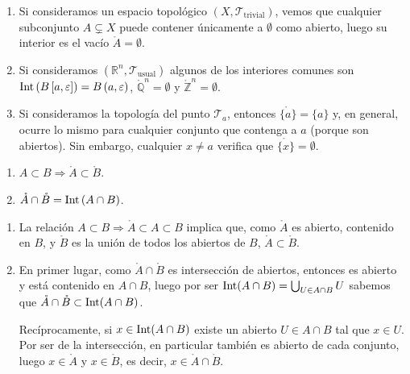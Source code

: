 \begin{ej}
\begin{enumerate}
    \item Si consideramos un espacio topológico $\left( X, \mathcal{T}_{\text{trivial}} \right)$, vemos que cualquier subconjunto $A \subsetneq X$ puede contener únicamente a $\emptyset$ como abierto, luego su interior es el vacío $\mathring{A} = \emptyset$.

    \item Si consideramos $(\mathbb{R}^n, \mathcal{T}_{\text{usual}})$ algunos de los interiores comunes son $\operatorname{Int}\left( B\left[ a, \varepsilon \right] \right)  = B\left( a, \varepsilon \right)$, $\mathring{\mathbb{Q}}^n = \emptyset$ y $\mathring{\mathbb{Z}}^n = \emptyset$.
    
    \item Si consideramos la topología del punto $\mathcal{T}_a$, entonces $\mathring{\{a\}} = \{a\}$ y, en general, ocurre lo mismo para cualquier conjunto que contenga a $a$ (porque son abiertos). Sin embargo, cualquier $x \neq a$ verifica que $\mathring{\{x\}} = \emptyset$.
\end{enumerate}
\end{ej}

\begin{coro}
\begin{enumerate}
    \item $A \subset B \Rightarrow \mathring{A} \subset \mathring{B}$.
    \item $\mathring{A} \cap \mathring{B} = \operatorname{Int} \left( A \cap B \right)$.
\end{enumerate}
\end{coro}
\begin{demo}
\begin{enumerate}
    \item La relación $A \subset B \Rightarrow \mathring{A} \subset A \subset B$ implica que, como $\mathring{A}$ es abierto, contenido en $B$, y $\mathring{B}$ es la unión de todos los abiertos de $B$, $\mathring{A} \subset \mathring{B}$.
    \item En primer lugar, como $\mathring{A}\cap \mathring{B}$ es intersección de abiertos, entonces es abierto y está contenido en $A\cap B$, luego por ser $\operatorname{Int}(A\cap B) = \bigcup_{U\in A\cap B}U$ sabemos que $\mathring{A}\cap \mathring{B} \subset \operatorname{Int}(A\cap B)$.
    
	Recíprocamente, si $x\in \operatorname{Int}(A\cap B)$ existe un abierto $U \in A\cap B$ tal que $x\in U$. Por ser de la intersección, en particular también es abierto de cada conjunto, luego $x\in \mathring{A}$ y $x\in \mathring{B}$, es decir, $x\in \mathring{A}\cap \mathring{B}$.
\end{enumerate}
\end{demo}

